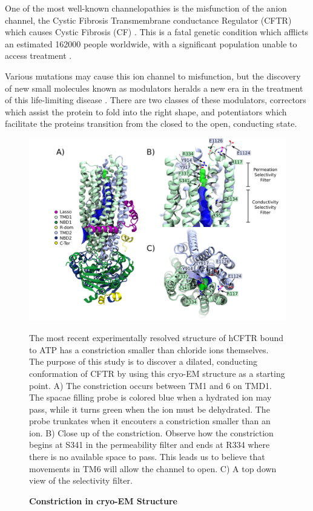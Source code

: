One of the most well-known channelopathies is the misfunction of the anion channel, the Cystic Fibrosis Transmembrane conductance Regulator (CFTR) which causes Cystic Fibrosis (CF) \cite{riordan1989,gadsby2006}. This is a fatal genetic condition which afflicts an estimated 162000 people worldwide, with a significant population unable to access treatment \cite{guo2022}.

Various mutations may cause this ion channel to misfunction, but the discovery of new small molecules known as modulators heralds a new era in the treatment of this life-limiting disease \cite{}. There are two classes of these modulators, correctors which assist the protein to fold into the right shape, and potentiators which facilitate the proteins transition from the closed to the open, conducting state. 

\begin{figure}
	\begin{center}
		\includegraphics[width=1\textwidth]{figures/opening/overall_hole_constricted.pdf}
	\end{center}
	\captionsetup{singlelinecheck = false, justification=raggedright}
	\caption[Constriction in cryo-EM Structure] {\textbf{Constriction in cryo-EM Structure}}{The most recent experimentally resolved structure of hCFTR bound to ATP has a constriction smaller than chloride ions themselves\cite{zhang2018}. The purpose of this study is to discover a dilated, conducting conformation of CFTR by using this cryo-EM structure as a starting point. A) The constriction occurs between TM1 and 6 on TMD1. The spacae filling probe is colored blue when a hydrated ion may pass, while it turns green when the ion must be dehydrated. The probe trunkates when it encouters a constriction smaller than an ion.  B) Close up of the constriction. Observe how the constriction begins at S341 in the permeability filter and ends at R334 where there is no available space to pass. This leads us to believe that movements in TM6 will allow the channel to open. C) A top down view of the selectivity filter.}
	\label{summary_FES}
\end{figure}

